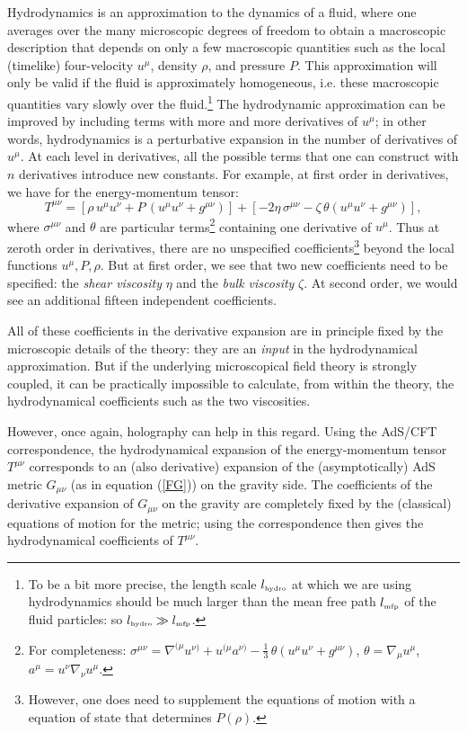 \documentclass[12pt]{article}
\def\be{\begin{equation}}
\def\ee{\end{equation}}
\renewcommand{\^}[1]{\hat{#1}}
\newcommand{\tn}[1]{\mbox{\tiny #1}}
\begin{document}
Hydrodynamics is an approximation to the dynamics of a fluid, where one averages over the many microscopic degrees of freedom to obtain a macroscopic description that depends on only a few macroscopic quantities such as the local (timelike) four-velocity $u^{\mu}$, density $\rho$, and pressure $P$. This approximation will only be valid if the fluid is approximately homogeneous, i.e. these macroscopic quantities vary slowly over the fluid.\footnote{To be a bit more precise, the length scale $l_{\tn{hydro}}$ at which we are using hydrodynamics should be much
larger than the mean free path $l_{\tn{mfp}}$ of the fluid particles: so $l_{\tn{hydro}}\gg l_{\tn{mfp}}$.} The hydrodynamic approximation can be improved by including terms with more and more derivatives of $u^{\mu}$; in other words, hydrodynamics is a perturbative expansion in the number of derivatives of $u^{\mu}$. At each level in derivatives, all the possible terms that one can construct with $n$ derivatives introduce new constants. For example, at first order in derivatives, we have for the energy-momentum tensor:
\be 
T^{\mu\nu} = \left[\rho\, u^{\mu} u^{\nu} + P\, (u^{\mu}u^{\nu} + g^{\mu\nu})\right] +\left[ -2\eta\, \sigma^{\mu\nu} - \zeta\, \theta (u^{\mu}u^{\nu}+g^{\mu\nu})\right]    ,
\ee
where $\sigma^{\mu\nu}$ and $\theta$ are particular terms\footnote{For completeness: $\sigma^{\mu\nu} = \nabla^{(\mu}u^{\nu)} + u^{(\mu}a^{\nu)} - \frac13\, \theta(u^{\mu}u^{\nu}+g^{\mu\nu})$,  $\theta = \nabla_{\mu} u^{\mu}$, $ a^{\mu} = u^{\nu}\nabla_{\nu} u^{\mu}.$} containing one derivative of $u^{\mu}$. Thus at zeroth order in derivatives, there are no unspecified coefficients\footnote{However, one does need to supplement the equations of motion with a equation of state that determines $P(\rho)$.} beyond the local functions $u^{\mu}, P, \rho$. But at first order, we see that two new coefficients need to be specified: the \emph{shear viscosity} $\eta$ and the \emph{bulk viscosity} $\zeta$. At second order, we would see an additional fifteen independent coefficients. 

All of these coefficients in the derivative expansion are in principle fixed by the microscopic details of the theory: they are an \emph{input} in the hydrodynamical approximation. But if the underlying microscopical field theory is strongly coupled, it can be practically impossible to calculate, from within the theory, the hydrodynamical coefficients such as the two viscosities. 

However, once again, holography can help in this regard. Using the AdS/CFT correspondence, the hydrodynamical expansion of the energy-momentum tensor $T^{\mu\nu}$ corresponds to an (also derivative) expansion of the (asymptotically) AdS metric $G_{\mu\nu}$ (as in equation (\ref{FG})) on the gravity side. The coefficients of the derivative expansion of $G_{\mu\nu}$ on the gravity are completely fixed by the (classical) equations of motion for the metric; using the correspondence then gives the hydrodynamical coefficients of $T^{\mu\nu}$.
\end{document}
